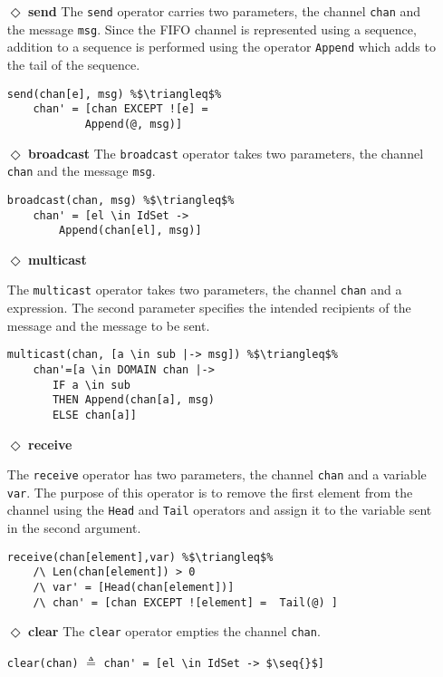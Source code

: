 \begin{itemize}

\item[$\Diamond$]  \textbf{send} The \verb|send| operator carries two parameters, the channel \verb|chan| and the message \verb|msg|. Since the FIFO channel is represented using a \tlaplus sequence, addition to a sequence is performed using the operator \verb|Append| which adds to the tail of the sequence.

\begin{lstlisting}[frame = none, numbers = none, escapechar=\%]
send(chan[e], msg) %$\triangleq$%
    chan' = [chan EXCEPT ![e] =
            Append(@, msg)]
\end{lstlisting}


\item[$\Diamond$]  \textbf{broadcast}
The \verb|broadcast| operator takes two parameters, the channel \verb|chan| and the message \verb|msg|.

\begin{lstlisting}[frame = none, numbers = none, escapechar=\%]
broadcast(chan, msg) %$\triangleq$%
    chan' = [el \in IdSet -> 
        Append(chan[el], msg)]
\end{lstlisting}

\item[$\Diamond$] \textbf{multicast}

The \verb|multicast| operator takes two parameters, the channel \verb|chan| and a \tlaplus expression. The second parameter specifies the intended recipients of the message and the message to be sent. 


\begin{lstlisting}[frame = none, numbers = none, escapechar=\%]
multicast(chan, [a \in sub |-> msg]) %$\triangleq$%
    chan'=[a \in DOMAIN chan |-> 
       IF a \in sub 
       THEN Append(chan[a], msg)
       ELSE chan[a]]
\end{lstlisting}

\item[$\Diamond$]  \textbf{receive}

The \verb|receive| operator has two parameters, the channel \verb|chan| and a \tlaplus variable \verb|var|. The purpose of this operator is to remove the first element from the channel using the \verb|Head| and \verb|Tail| operators and assign it to the variable sent in the second argument.

\begin{lstlisting}[frame = none, numbers = none, escapechar=\%]
receive(chan[element],var) %$\triangleq$%
    /\ Len(chan[element]) > 0 
    /\ var' = [Head(chan[element])]
    /\ chan' = [chan EXCEPT ![element] =  Tail(@) ]
\end{lstlisting}


\item[$\Diamond$]  \textbf{clear}
The \verb|clear| operator empties the channel \verb|chan|.

\begin{center}

\lstinline|clear(chan)| $\triangleq$
\lstinline[mathescape]|chan' = [el \in IdSet -> $\seq{}$]|

\end{center}
\end{itemize}


